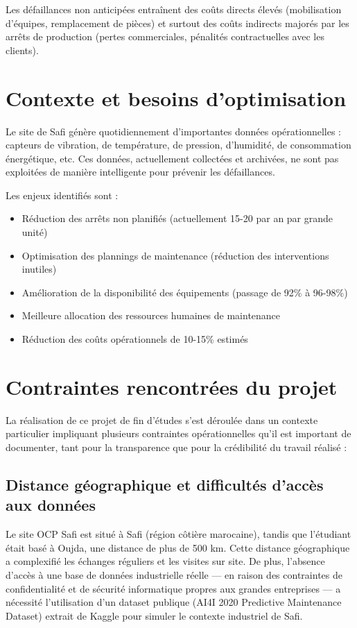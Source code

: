 \documentclass[a4paper,12pt,twoside]{report}
\begin{document}
Les défaillances non anticipées entraînent des coûts directs élevés (mobilisation d'équipes, remplacement de pièces) et surtout des coûts indirects majorés par les arrêts de production (pertes commerciales, pénalités contractuelles avec les clients).

\section{Contexte et besoins d'optimisation}

Le site de Safi génère quotidiennement d'importantes données opérationnelles : capteurs de vibration, de température, de pression, d'humidité, de consommation énergétique, etc. Ces données, actuellement collectées et archivées, ne sont pas exploitées de manière intelligente pour prévenir les défaillances.

Les enjeux identifiés sont :
\begin{itemize}
    \item Réduction des arrêts non planifiés (actuellement 15-20 par an par grande unité)
    \item Optimisation des plannings de maintenance (réduction des interventions inutiles)
    \item Amélioration de la disponibilité des équipements (passage de 92\% à 96-98\%)
    \item Meilleure allocation des ressources humaines de maintenance
    \item Réduction des coûts opérationnels de 10-15\% estimés
\end{itemize}

\section{Contraintes rencontrées du projet}

La réalisation de ce projet de fin d'études s'est déroulée dans un contexte particulier impliquant plusieurs contraintes opérationnelles qu'il est important de documenter, tant pour la transparence que pour la crédibilité du travail réalisé :

\subsection{Distance géographique et difficultés d'accès aux données}

Le site OCP Safi est situé à Safi (région côtière marocaine), tandis que l'étudiant était basé à Oujda, une distance de plus de 500 km. Cette distance géographique a complexifié les échanges réguliers et les visites sur site. De plus, l'absence d'accès à une base de données industrielle réelle — en raison des contraintes de confidentialité et de sécurité informatique propres aux grandes entreprises — a nécessité l'utilisation d'un dataset publique (AI4I 2020 Predictive Maintenance Dataset) extrait de Kaggle pour simuler le contexte industriel de Safi.
\end{document}
